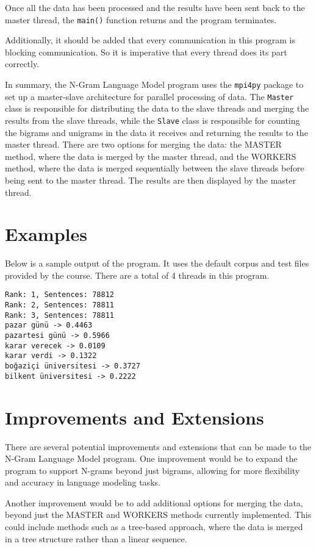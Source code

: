 \documentclass[12pt, A4, titlepage]{article}
\begin{document}
Once all the data has been processed and the results have been sent back to the master thread, the \texttt{main()} function returns and the program terminates.

Additionally, it should be added that every communication in this program is blocking communication. So it is imperative that every thread does its part correctly.

In summary, the N-Gram Language Model program uses the \texttt{mpi4py} package to set up a master-slave architecture for parallel processing of data. The \texttt{Master} class is responsible for distributing the data to the slave threads and merging the results from the slave threads, while the \texttt{Slave} class is responsible for counting the bigrams and unigrams in the data it receives and returning the results to the master thread. There are two options for merging the data: the MASTER method, where the data is merged by the master thread, and the WORKERS method, where the data is merged sequentially between the slave threads before being sent to the master thread. The results are then displayed by the master thread. 

\section{Examples}

Below is a sample output of the program. It uses the default corpus and test files provided by the course. There are a total of 4 threads in this program. 

\begin{verbatim}
Rank: 1, Sentences: 78812
Rank: 2, Sentences: 78811
Rank: 3, Sentences: 78811
pazar günü -> 0.4463
pazartesi günü -> 0.5966
karar verecek -> 0.0109
karar verdi -> 0.1322
boğaziçi üniversitesi -> 0.3727
bilkent üniversitesi -> 0.2222
\end{verbatim}


\section{Improvements and Extensions}

There are several potential improvements and extensions that can be made to the N-Gram Language Model program. One improvement would be to expand the program to support N-grams beyond just bigrams, allowing for more flexibility and accuracy in language modeling tasks.

Another improvement would be to add additional options for merging the data, beyond just the MASTER and WORKERS methods currently implemented. This could include methods such as a tree-based approach, where the data is merged in a tree structure rather than a linear sequence.
\end{document}
